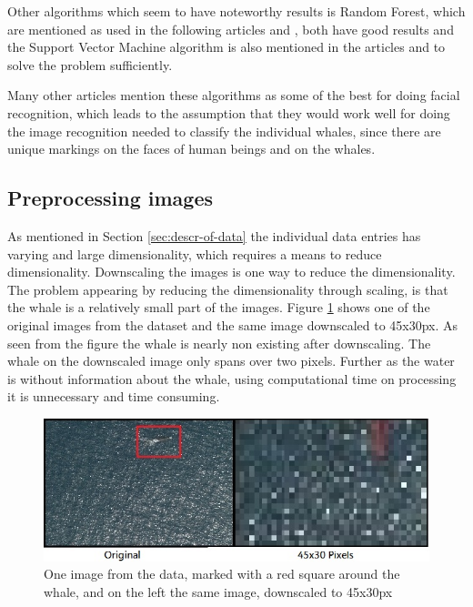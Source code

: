 Other algorithms which seem to have noteworthy results is Random Forest, which are mentioned as used in the following articles \cite{lit:rn1} and \cite{lit:rn2}, both have good results and the Support Vector Machine algorithm is also mentioned in the articles \cite{lit:svm1} and \cite{lit:svm2} to solve the problem sufficiently.

Many other articles mention these algorithms as some of the best for doing facial recognition, which leads to the assumption that they would work well for doing the image recognition needed to classify the individual whales, since there are unique markings on the faces of human beings and on the whales.





\subsection{Preprocessing images}
\label{sec:litterature}
As mentioned in Section \ref{sec:descr-of-data} the individual data entries has varying and large dimensionality, which requires a means to reduce dimensionality. 
Downscaling the images is one way to reduce the dimensionality.
The problem appearing by reducing the dimensionality through scaling, is that the whale is a relatively small part of the images. Figure \ref{fig:scale} shows one of the original images from the dataset and the same image downscaled to 45x30px. As seen from the figure the whale is nearly non existing after downscaling. The whale on the downscaled image only spans over two pixels.
Further as the water is without information about the whale, using computational time on processing it is unnecessary and time consuming.

\begin{figure}
	\centering
	\includegraphics[width=\linewidth]{Images/scale}
	\caption{One image from the data, marked with a red square around the whale, and on the left the same image, downscaled to 45x30px}
\label{fig:scale}
\end{figure}

